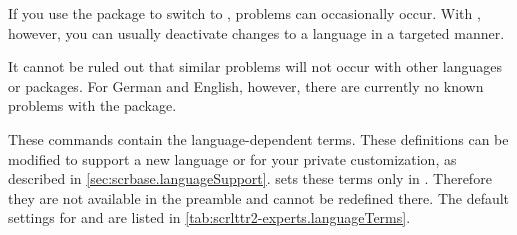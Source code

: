 If you use the  package to switch to
, problems can occasionally occur. With ,
however, you can usually deactivate changes to a language in a targeted
manner.%
\iffalse%
\ If the package \Package{french} is not installed, the problem with
  \Package{babel} does not arise. Similarly, the problem usually does not
  exist when you use \Package{babel} with other varieties of French such as
  \PValue{acadian}, \PValue{canadien}, \PValue{francais} or \PValue{frenchb}
  instead of \PValue{french}.
\fi

\iffalse%
  However, with \Package{babel} version 3.7j and above, this problem only occurs
  if the option explicitly indicates that \Package{babel} should use the
  \Package{french} package.
%
\iftrue
  If you cannot be sure you are not using an old version of \Package{babel}, I
  recommend you use
\begin{lstcode}
  \usepackage[...,frenchb,...]{babel}
\end{lstcode}
  to select French.
    \iffalse %
      If necessary, you can still switch to French with
      \Macro{selectlanguage}\PParameter{french}.%
    \fi%
\fi 
\fi  

\iftrue
  It cannot be ruled out that similar problems will not occur with other
  languages or packages. For German and English, however, there are currently
  no known problems with the  package.
\fi


\begin{Declaration}
\end{Declaration}
These commands contain the language-dependent terms. These definitions can be
modified to support a new language or for your private customization, as
described in
\autoref{sec:scrbase.languageSupport}. \KOMAScript{} sets these terms only in
. Therefore they are not available in the
preamble and cannot be redefined there. The default settings for
 and  are listed in
\autoref{tab:scrlttr2-experts.languageTerms}.%
\EndIndexGroup

